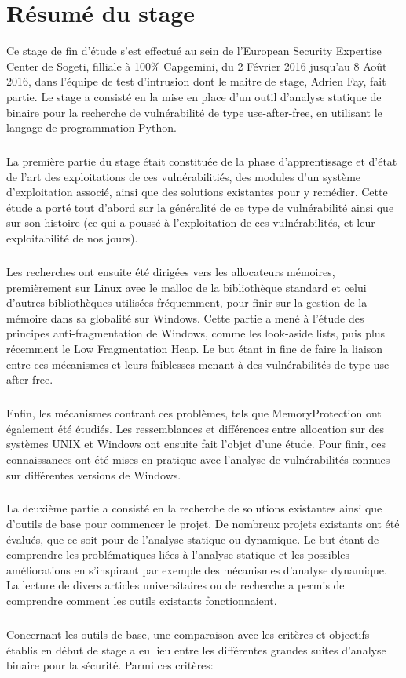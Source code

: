 \section*{Résumé du stage}
Ce stage de fin d'étude s'est effectué au sein de l'European Security Expertise Center de Sogeti, filliale à 100\% Capgemini, du 2 Février 2016 jusqu'au 8 Août 2016, dans
l'équipe de test d'intrusion dont le maitre de stage, Adrien Fay, fait partie. Le stage a consisté en la mise en place d'un outil d'analyse statique de binaire pour la recherche
de vulnérabilité de type use-after-free, en utilisant le langage de programmation Python.
\subparagraph{}
La première partie du stage était constituée de la phase d'apprentissage et d'état de l'art des exploitations de ces vulnérabilitiés, des modules d'un système d'exploitation associé, ainsi que des solutions
existantes pour y remédier. Cette étude a porté tout d'abord sur la généralité de ce type de vulnérabilité ainsi que sur son histoire (ce qui a poussé à l'exploitation de ces vulnérabilités, et leur
exploitabilité de nos jours).
\subparagraph{}
Les recherches ont ensuite été dirigées vers les allocateurs mémoires, premièrement sur Linux avec le malloc de la bibliothèque standard et celui d'autres bibliothèques
utilisées fréquemment, pour finir sur la gestion de la mémoire dans sa globalité sur Windows. Cette partie a mené à l'étude des principes anti-fragmentation de Windows, comme les look-aside lists, puis
plus récemment le Low Fragmentation Heap. Le but étant in fine de faire la liaison entre ces mécanismes et leurs faiblesses menant à des vulnérabilités de type use-after-free.
\subparagraph{}
Enfin, les mécanismes contrant ces problèmes, tels que MemoryProtection ont également été étudiés. Les ressemblances et différences entre allocation sur des systèmes UNIX et Windows ont
ensuite fait l'objet d'une étude. Pour finir, ces connaissances ont été mises en pratique avec l'analyse de vulnérabilités connues sur différentes versions de Windows.
\subparagraph{}
La deuxième partie a consisté en la recherche de solutions existantes ainsi que d'outils de base pour commencer le projet. De nombreux projets existants ont été évalués, que ce soit pour de l'analyse statique ou dynamique. Le but étant de comprendre les problématiques liées à l'analyse statique et les possibles améliorations en s'inspirant par exemple des mécanismes d'analyse dynamique.
La lecture de divers articles universitaires ou de recherche a permis de comprendre comment les outils existants fonctionnaient.
\subparagraph{}
Concernant les outils de base, une comparaison avec les critères et objectifs établis en début de stage a eu lieu entre les différentes grandes suites d'analyse binaire pour la sécurité. Parmi ces critères:
